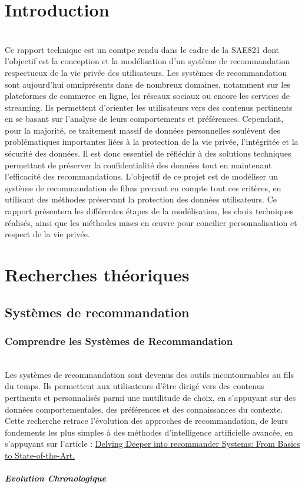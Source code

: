 \documentclass{article}
\begin{document}
\tableofcontents
\newpage

\section*{Introduction}
$ $\\
Ce rapport technique est un comtpe rendu dans le cadre de la SAE821 dont l'objectif est la conception et la modélisation d’un système de recommandation respectueux de la vie privée des utilisateurs. Les systèmes de recommandation sont aujourd’hui omniprésents dans de nombreux domaines, notamment sur les plateformes de commerce en ligne, les réseaux sociaux ou encore les services de streaming. Ils permettent d’orienter les utilisateurs vers des contenus pertinents en se basant sur l’analyse de leurs comportements et préférences.
Cependant, pour la majorité, ce traitement massif de données personnelles soulèvent des problématiques importantes liées à la protection de la vie privée, l'intégritée et la sécurité des données. Il est donc essentiel de réfléchir à des solutions techniques permettant de préserver la confidentialité des données tout en maintenant l’efficacité des recommandations.
L’objectif de ce projet est de modéliser un système de recommandation de films prenant en compte tout ces critères, en utilisant des méthodes préservant la protection des données utilisateurs. Ce rapport présentera les différentes étapes de la modélisation, les choix techniques réalisés, ainsi que les méthodes mises en œuvre pour concilier personnalisation et respect de la vie privée.

\section{Recherches théoriques}
\subsection{Systèmes de recommandation}
\subsubsection{Comprendre les Systèmes de Recommandation}
$ $\\
Les systèmes de recommandation sont devenus des outils incontournables au fils du temps. Ils permettent aux utilisateurs d'être dirigé vers des contenus pertinents et personnalisés parmi une mutilitude de choix, en s'appuyant sur des données comportementales, des préférences et des connaissances du contexte. Cette recherche retrace l'évolution des approches de recommandation, de leurs fondements les plus simples à des méthodes d'intelligence artificielle avancée, en s'appuyant sur l'article : \href{https://medium.com/@eliasah/delving-deeper-into-recommander-systems-from-basics-to-state-of-the-art-d92ee8e277f2}{ Delving Deeper into recommander Systems: From Basics to State-of-the-Art.}
\subparagraph{Evolution Chronologique}
\end{document}
